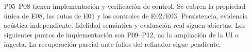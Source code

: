 P05--P08 tienen implementación y verificación de control. Se cubren la propiedad
única de E08, las rutas de E01 y los controles de E02/E03. Persistencia, evidencia
acústica independiente, fidelidad semántica y evaluación real siguen abiertas.
Los siguientes puntos de implementación son P09--P12, no la ampliación de la UI
o ingesta. La recuperación parcial ante fallos del refinador sigue pendiente.
